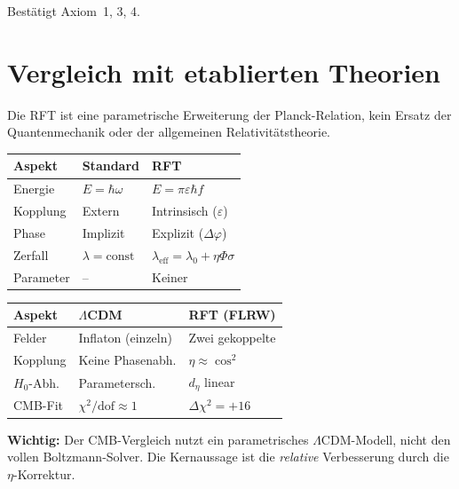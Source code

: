 \documentclass[12pt]{iopart}
\begin{document}
	Best\"atigt Axiom~1, 3, 4.
	
	\section{Vergleich mit etablierten Theorien}
	
	Die RFT ist eine parametrische Erweiterung der
	Planck-Relation, kein Ersatz der Quantenmechanik
	oder der allgemeinen Relativit\"atstheorie.
	
	\medskip
	\begin{center}
		\small
		\begin{tabular}{lll}
			\hline
			\textbf{Aspekt} & \textbf{Standard}
			& \textbf{RFT} \\
			\hline
			Energie & $E = \hbar\omega$
			& $E = \pi\varepsilon\hbar f$ \\
			Kopplung & Extern
			& Intrinsisch ($\varepsilon$) \\
			Phase & Implizit
			& Explizit ($\Delta\varphi$) \\
			Zerfall & $\lambda = \mathrm{const}$
			& $\lambda_{\mathrm{eff}}
			= \lambda_0 + \eta\Phi\sigma$ \\
			Parameter & --
			& Keiner \\
			\hline
		\end{tabular}
	\end{center}
	
	\medskip
	\begin{center}
		\small
		\begin{tabular}{lll}
			\hline
			\textbf{Aspekt}
			& \textbf{$\Lambda$CDM}
			& \textbf{RFT (FLRW)} \\
			\hline
			Felder & Inflaton (einzeln)
			& Zwei gekoppelte \\
			Kopplung & Keine Phasenabh.
			& $\eta \approx \cos^2$ \\
			$H_0$-Abh. & Parametersch.
			& $d_\eta$ linear \\
			CMB-Fit & $\chi^2/\mathrm{dof}
			\approx 1$
			& $\Delta\chi^2 = +16$ \\
			\hline
		\end{tabular}
	\end{center}
	
	\textbf{Wichtig:} Der CMB-Vergleich nutzt ein
	parametrisches $\Lambda$CDM-Modell, nicht den vollen
	Boltzmann-Solver. Die Kernaussage ist die
	\textit{relative} Verbesserung durch die
	$\eta$-Korrektur.
	
\end{document}

